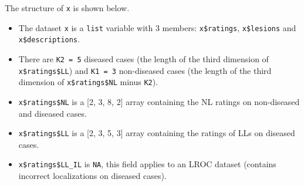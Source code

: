 \documentclass[
]{book}
\newenvironment{Shaded}{\begin{snugshade}}{\end{snugshade}}
\newcommand{\AttributeTok}[1]{\textcolor[rgb]{0.77,0.63,0.00}{#1}}
\newcommand{\CommentTok}[1]{\textcolor[rgb]{0.56,0.35,0.01}{\textit{#1}}}
\newcommand{\DecValTok}[1]{\textcolor[rgb]{0.00,0.00,0.81}{#1}}
\newcommand{\FunctionTok}[1]{\textcolor[rgb]{0.00,0.00,0.00}{#1}}
\newcommand{\NormalTok}[1]{#1}
\newcommand{\SpecialCharTok}[1]{\textcolor[rgb]{0.00,0.00,0.00}{#1}}
\providecommand{\tightlist}{%
  \setlength{\itemsep}{0pt}\setlength{\parskip}{0pt}}
\begin{document}
The structure of \texttt{x} is shown below.

\begin{Shaded}
\end{Shaded}

\begin{itemize}
\tightlist
\item
  The dataset \texttt{x} is a \texttt{list} variable with 3 members: \texttt{x\$ratings}, \texttt{x\$lesions} and \texttt{x\$descriptions}.
\end{itemize}

\begin{Shaded}
\end{Shaded}

\begin{itemize}
\tightlist
\item
  There are \texttt{K2\ =\ 5} diseased cases (the length of the third dimension of \texttt{x\$ratings\$LL}) and \texttt{K1\ =\ 3} non-diseased cases (the length of the third dimension of \texttt{x\$ratings\$NL} minus \texttt{K2}).
\item
  \texttt{x\$ratings\$NL} is a {[}2, 3, 8, 2{]} array containing the NL ratings on non-diseased and diseased cases.
\item
  \texttt{x\$ratings\$LL} is a {[}2, 3, 5, 3{]} array containing the ratings of LLs on diseased cases.
\item
  \texttt{x\$ratings\$LL\_IL} is \texttt{NA}, this field applies to an LROC dataset (contains incorrect localizations on diseased cases).
\end{itemize}

\begin{Shaded}
\end{Shaded}
\end{document}
